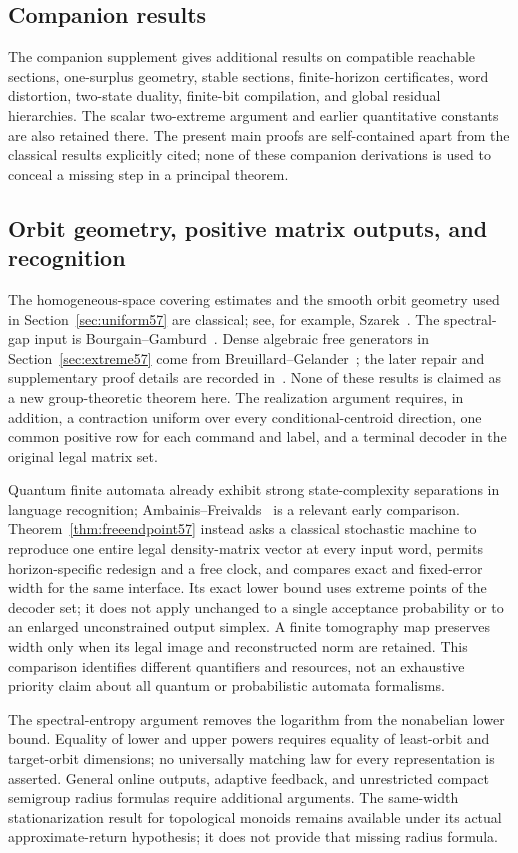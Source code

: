 \subsection{Companion results}
The companion supplement gives additional results on compatible reachable sections, one-surplus geometry, stable sections, finite-horizon certificates, word distortion, two-state duality, finite-bit compilation, and global residual hierarchies. The scalar two-extreme argument and earlier quantitative constants are also retained there. The present main proofs are self-contained apart from the classical results explicitly cited; none of these companion derivations is used to conceal a missing step in a principal theorem.

\subsection{Orbit geometry, positive matrix outputs, and recognition}
The homogeneous-space covering estimates and the smooth orbit geometry used in Section~\ref{sec:uniform57} are classical; see, for example, Szarek~\cite{Szarek57}. The spectral-gap input is Bourgain--Gamburd~\cite{BG2012}. Dense algebraic free generators in Section~\ref{sec:extreme57} come from Breuillard--Gelander~\cite[Theorem~1.1]{BreuillardGelander57}; the later repair and supplementary proof details are recorded in~\cite{BreuillardGelanderCorrection57}. None of these results is claimed as a new group-theoretic theorem here. The realization argument requires, in addition, a contraction uniform over every conditional-centroid direction, one common positive row for each command and label, and a terminal decoder in the original legal matrix set.

Quantum finite automata already exhibit strong state-complexity separations in language recognition; Ambainis--Freivalds~\cite{AF57} is a relevant early comparison. Theorem~\ref{thm:freeendpoint57} instead asks a classical stochastic machine to reproduce one entire legal density-matrix vector at every input word, permits horizon-specific redesign and a free clock, and compares exact and fixed-error width for the same interface. Its exact lower bound uses extreme points of the decoder set; it does not apply unchanged to a single acceptance probability or to an enlarged unconstrained output simplex. A finite tomography map preserves width only when its legal image and reconstructed norm are retained. This comparison identifies different quantifiers and resources, not an exhaustive priority claim about all quantum or probabilistic automata formalisms.

The spectral-entropy argument removes the logarithm from the nonabelian lower bound. Equality of lower and upper powers requires equality of least-orbit and target-orbit dimensions; no universally matching law for every representation is asserted. General online outputs, adaptive feedback, and unrestricted compact semigroup radius formulas require additional arguments. The same-width stationarization result for topological monoids remains available under its actual approximate-return hypothesis; it does not provide that missing radius formula.
